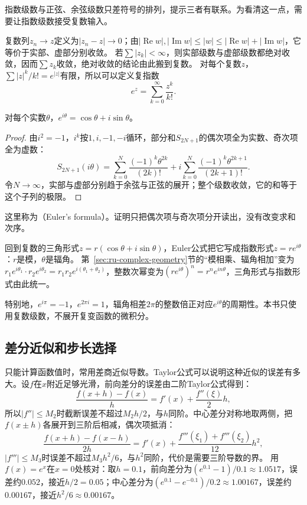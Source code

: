 指数级数与正弦、余弦级数只差符号的排列，提示三者有联系。为看清这一点，需要让指数级数接受复数输入。

复数列$z_n\to z$定义为$|z_n-z|\to0$；由$|\operatorname{Re}w|,|\operatorname{Im}w|\leq|w|\leq|\operatorname{Re}w|+|\operatorname{Im}w|$，它等价于实部、虚部分别收敛。
若$\sum|z_k|<\infty$，则实部级数与虚部级数都绝对收敛，因而$\sum z_k$收敛，绝对收敛的结论由此搬到复数。
对每个复数$z$，$\sum|z|^k/k!=e^{|z|}$有限，所以可以定义复指数
\[
 e^z=\sum_{k=0}^\infty\frac{z^k}{k!}.
\]

\begin{theorem}[Euler公式]
\label{thm:ru-euler-formula}
对每个实数$\theta$，$e^{i\theta}=\cos\theta+i\sin\theta$。
\end{theorem}
\begin{proof}
由$i^2=-1$，$i^k$按$1,i,-1,-i$循环，部分和$S_{2N+1}$的偶次项全为实数、奇次项全为虚数：
\[
 S_{2N+1}(i\theta)=\sum_{k=0}^N\frac{(-1)^k\theta^{2k}}{(2k)!}+i\sum_{k=0}^N\frac{(-1)^k\theta^{2k+1}}{(2k+1)!}.
\]
令$N\to\infty$，实部与虚部分别趋于余弦与正弦的展开；整个级数收敛，它的和等于这个子列的极限。
\end{proof}
这里称为（Euler's formula）。证明只把偶次项与奇次项分开读出，没有改变求和次序。

回到复数的三角形式$z=r(\cos\theta+i\sin\theta)$，Euler公式把它写成指数形式$z=re^{i\theta}$：$r$是模，$\theta$是辐角。
第~\ref{sec:ru-complex-geometry}节的“模相乘、辐角相加”变为$r_1e^{i\theta_1}\cdot r_2e^{i\theta_2}=r_1r_2e^{i(\theta_1+\theta_2)}$，整数次幂变为$(re^{i\theta})^n=r^ne^{in\theta}$，三角形式与指数形式由此统一。

特别地，$e^{i\pi}=-1$，$e^{2\pi i}=1$，辐角相差$2\pi$的整数倍正对应$e^{i\theta}$的周期性。本书只使用复数级数，不展开复变函数的微积分。

\subsection{差分近似和步长选择}
\label{sec:ru-finite-differences}

只能计算函数值时，常用差商近似导数。Taylor公式可以说明这种近似的误差有多大。设$f$在$x$附近足够光滑，前向差分的误差由二阶Taylor公式得到：
\[
 \frac{f(x+h)-f(x)}h=f'(x)+\frac{f''(\xi)}2h,
\]
所以$|f''|\leq M_2$时截断误差不超过$M_2h/2$，与$h$同阶。中心差分对称地取两侧，把$f(x\pm h)$各展开到三阶后相减，偶次项抵消：
\[
 \frac{f(x+h)-f(x-h)}{2h}=f'(x)+\frac{f'''(\xi_1)+f'''(\xi_2)}{12}h^2,
\]
$|f'''|\leq M_3$时误差不超过$M_3h^2/6$，与$h^2$同阶，代价是需要三阶导数的界。
用$f(x)=e^x$在$x=0$处核对：取$h=0.1$，前向差分为$(e^{0.1}-1)/0.1\approx1.0517$，误差约$0.052$，接近$h/2=0.05$；中心差分为$(e^{0.1}-e^{-0.1})/0.2\approx1.00167$，误差约$0.00167$，接近$h^2/6\approx0.00167$。

